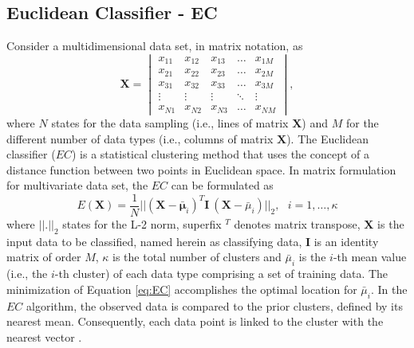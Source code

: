 \documentclass[preprint,12pt]{elsarticle}
\begin{document}
\subsection{Euclidean Classifier - EC}
\label{sub:EC}
Consider a multidimensional data set, in matrix notation, as 
\begin{equation}
\textbf{$\textbf{X}$} =
\begin{vmatrix} 
x_{11} & x_{12} & x_{13} & \hdots  & x_{1M} \\
x_{21} & x_{22} & x_{23} & \hdots  & x_{2M} \\
x_{31} & x_{32} & x_{33} & \hdots  & x_{3M} \\
\vdots & \vdots & \vdots & \ddots  &\vdots  \\
x_{N1} & x_{N2} & x_{N3} & \hdots  & x_{NM}
\end{vmatrix},
\label{eq:multidata}
\end{equation}
where $N$ states for the data sampling (i.e., lines of matrix $\mathbf{X}$) and $M$ for the different number of data types (i.e., columns of matrix $\mathbf{X}$). 
The Euclidean classifier ($EC$) is a statistical clustering method that uses the concept of a distance function between two points in Euclidean space. In matrix formulation for multivariate data set, the $EC$ can be formulated as
\begin{equation}
E(\mathbf{X})= \frac{1}{N} || (\mathbf{X} - \bar{\mathbf{\mu}}_i)^{T} \mathbf{I} ~ (\mathbf{X} - \bar{\mu}_{i}) ||_2, ~~~i=1,\hdots, \kappa
\label{eq:EC}
\end{equation}
where $|| . ||_2$ states for the L-2 norm, superfix $^T$ denotes matrix transpose, $\mathbf{X}$ is the input data to be classified, named herein as classifying data, $\mathbf{I}$ is an identity matrix of order $M$, $\kappa$ is the total number of clusters and $\bar{\mu}_i$ is the $i$-th mean value (i.e., the $i$-th cluster) of each data type comprising a set of training data. The minimization of Equation \ref{eq:EC} accomplishes the optimal location for $\bar{\mu}_i$. In the $EC$ algorithm, the observed data is compared to the prior clusters, defined by its nearest mean. Consequently, each data point is linked to the cluster with the nearest vector \citep{nabney2003, karmakar2018}.    
\end{document}
